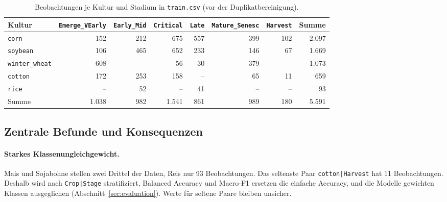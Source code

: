 \documentclass[11pt,a4paper,titlepage]{article}
\begin{document}
\begin{table}[H]
\centering
\caption{Beobachtungen je Kultur und Stadium in \texttt{train.csv}
	(vor der Duplikatbereinigung).}
\label{tab:eda-paare}
\small
\setlength{\tabcolsep}{4pt}
\begin{tabular}{@{}lrrrrrrr@{}}
	\toprule
	Kultur & \texttt{Emerge\_VEarly} & \texttt{Early\_Mid} & \texttt{Critical} & \texttt{Late} & \texttt{Mature\_Senesc} & \texttt{Harvest} & Summe \\
	\midrule
	\texttt{corn} & 152 & 212 & 675 & 557 & 399 & 102 & 2.097 \\
	\texttt{soybean} & 106 & 465 & 652 & 233 & 146 & 67 & 1.669 \\
	\texttt{winter\_wheat} & 608 & -- & 56 & 30 & 379 & -- & 1.073 \\
	\texttt{cotton} & 172 & 253 & 158 & -- & 65 & 11 & 659 \\
	\texttt{rice} & -- & 52 & -- & 41 & -- & -- & 93 \\
	\midrule
	Summe & 1.038 & 982 & 1.541 & 861 & 989 & 180 & 5.591 \\
	\bottomrule
\end{tabular}
\end{table}

\subsection{Zentrale Befunde und Konsequenzen}

\paragraph{Starkes Klassenungleichgewicht.}
Mais und Sojabohne stellen zwei Drittel der Daten, Reis nur 93 Beobachtungen.
Das seltenste Paar \texttt{cotton|Harvest} hat 11 Beobachtungen. Deshalb wird
nach \texttt{Crop|Stage} stratifiziert, Balanced Accuracy und Macro-F1 ersetzen
die einfache Accuracy, und die Modelle gewichten Klassen ausgeglichen
(Abschnitt~\ref{sec:evaluation}). Werte f\"ur seltene Paare bleiben unsicher.
\end{document}

